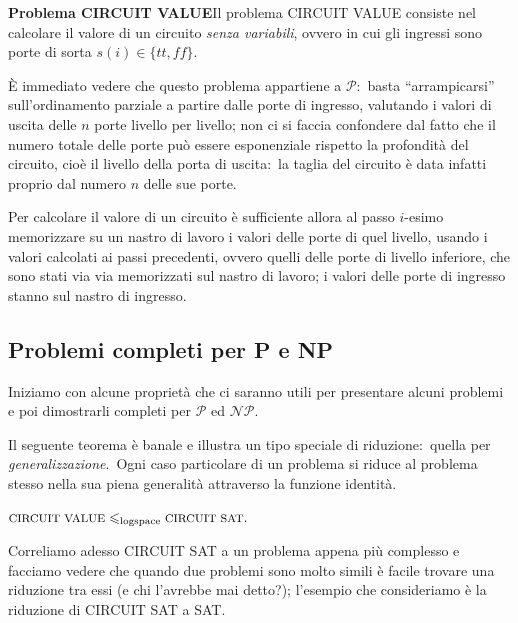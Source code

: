 \vspace{12pt}
\noindent\textbf{Problema CIRCUIT VALUE}\quad Il problema {\footnotesize CIRCUIT VALUE} consiste nel calcolare il valore di un circuito \textit{senza variabili}, ovvero in cui gli ingressi sono porte di sorta $s(i) \in \{\mathit{tt}, \mathit{ff}\}$.\

\medskip
\noindent È immediato vedere che questo problema appartiene a $\mathcal{P}$:\  basta ``arrampicarsi'' sull'ordinamento parziale a partire dalle porte di ingresso, valutando i valori di uscita delle $n$ porte livello per livello; non ci si faccia confondere dal fatto che il numero totale delle porte può essere esponenziale rispetto la profondità del circuito, cioè il livello della porta di uscita:\ la taglia del circuito è data infatti proprio dal numero $n$ delle sue porte.

Per calcolare il valore di un circuito è sufficiente allora al passo $i$-esimo memorizzare su un nastro di lavoro i valori delle porte di quel livello, usando i valori calcolati ai passi precedenti, ovvero quelli delle porte di livello inferiore, che sono stati via via memorizzati sul nastro di lavoro; i valori delle porte di ingresso stanno sul nastro di ingresso.\

\subsection{Problemi completi per P e NP}

Iniziamo con alcune proprietà che ci saranno utili per presentare alcuni problemi e poi dimostrarli completi per $\mathcal{P}$ ed $\mathcal{NP}$.\

Il seguente teorema è banale e illustra un tipo speciale di riduzione:\ quella per \textit{generalizzazione}.\
Ogni caso particolare di un problema si riduce al problema stesso nella sua piena generalità attraverso la funzione identità.

\begin{property}
    $\mbox{\footnotesize CIRCUIT VALUE} \leqslant_{\mathrm{logspace}} \mbox{\footnotesize CIRCUIT SAT}.$
\end{property}

\noindent Correliamo adesso {\footnotesize CIRCUIT SAT} a un problema appena più complesso e facciamo vedere che quando due problemi sono molto simili è facile trovare una riduzione tra essi (e chi l'avrebbe mai detto?); l'esempio che consideriamo è la riduzione di {\footnotesize CIRCUIT SAT} a {\footnotesize SAT}.

